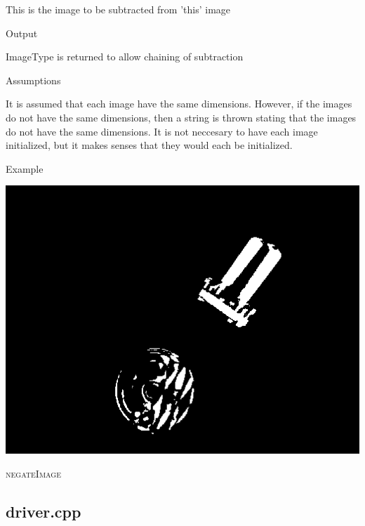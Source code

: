 \documentclass[pdftex, 11pt]{article}
\begin{document}
\begin{description}
\begin{description}
\begin{itemize}
						This is the image to be subtracted from
						'this' image

				\end{itemize}

			\item{Output}

				ImageType is returned to allow chaining of subtraction

			\item{Assumptions}

				It is assumed that each image have the same dimensions.
				However, if the images do not have the same dimensions,
				then a string is thrown stating that the images do
				not have the same dimensions. It is not neccesary to have
				each image initialized, but it makes senses
				that they would each be initialized.

			\item{Example}

				\includegraphics{images/outsubtract.png}

		\end{description}


	\item{\textsc{negateImage}}

\end{description}

\subsection{driver.cpp}
\end{document}

